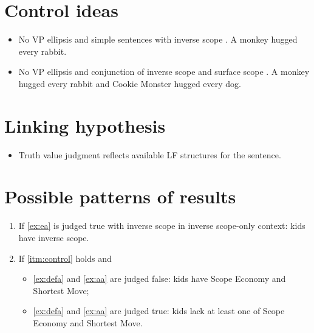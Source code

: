 \documentclass[11pt]{article}
\begin{document}
\section{Control ideas}
\label{sec:control_ideas}


\begin{itemize}
  \item No VP ellipsis and simple sentences with inverse scope 
    \ex. A monkey hugged every rabbit.

  \item No VP ellipsis and conjunction of inverse scope and surface scope 
    \ex. A monkey hugged every rabbit and Cookie Monster hugged every dog.

\end{itemize}

%

\section{Linking hypothesis}
\begin{itemize}
  \item Truth value judgment reflects available LF structures for the sentence.
\end{itemize}

\section{Possible patterns of results}

\begin{enumerate}[label=(\alph*)]
  \item \label{itm:control} If \ref{ex:ea} is judged true with inverse scope in inverse scope-only
    context: kids have inverse scope.
  \item If \ref{itm:control} holds and 
    \begin{itemize}
      \item \ref{ex:defa} and \ref{ex:aa} are judged false: kids have Scope Economy and Shortest Move;
      \item \ref{ex:defa} and \ref{ex:aa} are judged true: kids lack at least one of Scope
        Economy and Shortest Move.
    \end{itemize}

\end{enumerate}
\end{document}
